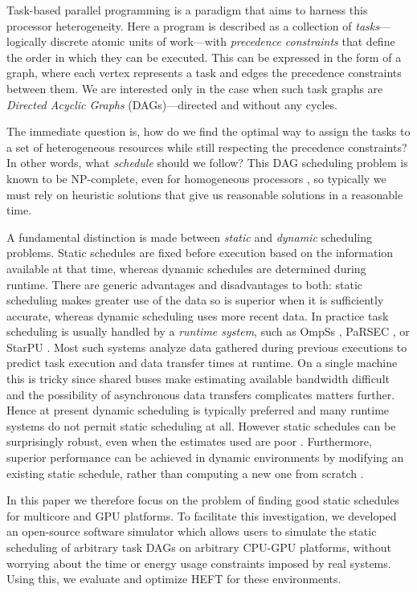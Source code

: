 \documentclass[runningheads]{llncs}
\begin{document}
Task-based parallel programming is a paradigm that aims to harness this processor heterogeneity. Here a program is described as a collection of {\em tasks}---logically discrete atomic units of work---with {\em precedence constraints} that define the order in which they can be executed. This can be expressed in the form of a graph, where each vertex represents a task and edges the precedence constraints between them. We are interested only in the case when such task graphs are {\em Directed Acyclic Graphs} (DAGs)---directed and without any cycles.  

The immediate question is, how do we find the optimal way to assign the tasks to a set of heterogeneous resources while still respecting the precedence constraints? In other words, what {\em schedule} should we follow? This DAG scheduling problem is known to be NP-complete, even for homogeneous processors \cite{topcuoglu2002performance}, so typically we must rely on heuristic solutions that give us reasonable solutions in a reasonable time.

A fundamental distinction is made between {\em static} and {\em dynamic} scheduling problems. Static schedules are fixed before execution based on the information available at that time, whereas dynamic schedules are determined during runtime. There are generic advantages and disadvantages to both: static scheduling makes greater use of the data so is superior when it is sufficiently accurate, whereas dynamic scheduling uses more recent data. In practice task scheduling is usually handled by a {\em runtime system}, such as OmpSs \cite{duran2011ompss}, PaRSEC \cite{bosilca2013parsec}, or StarPU \cite{augonnet2011starpu}. Most such systems analyze data gathered during previous executions to predict task execution and data transfer times at runtime. On a single machine this is tricky since shared buses make estimating available bandwidth difficult and the possibility of asynchronous data transfers complicates matters further. Hence at present dynamic scheduling is typically preferred and many runtime systems do not permit static scheduling at all. However static schedules can be surprisingly robust, even when the estimates used are poor \cite{agullo2016}. Furthermore, superior performance can be achieved in dynamic environments by modifying an existing static schedule, rather than computing a new one from scratch \cite{ZHENG20131673}. 

In this paper we therefore focus on the problem of finding good static schedules for multicore and GPU platforms. To facilitate this investigation, we developed an open-source software simulator which allows users to simulate the static scheduling of arbitrary task DAGs on arbitrary CPU-GPU platforms, without worrying about the time or energy usage constraints imposed by real systems. Using this, we evaluate and optimize HEFT for these environments.  
\end{document}
